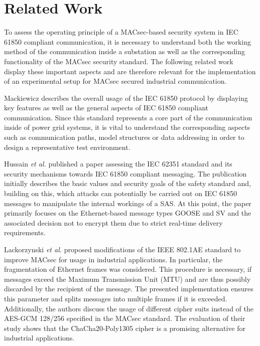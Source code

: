 \documentclass[conference, onecolumn, a4paper]{IEEEtran}
\begin{document}
\section{Related Work}
\label{chapter:relatedWork}
\noindent To assess the operating principle of a MACsec-based security system in IEC 61850 compliant communication, it is necessary to understand both 
the working method of the communication inside a substation as well as the corresponding functionality of the MACsec security standard. The following 
related work display these important aspects and are therefore relevant for the implementation of an experimental setup for MACsec secured industrial 
communication.

\smallskip
Mackiewicz \cite{IEC61850_Overview:2006} describes the overall usage of the IEC 61850 protocol by displaying key features as well as the general aspects 
of IEC 61850 compliant communication. Since this standard represents a core part of the communication inside of power grid systems, it is vital to 
understand the corresponding aspects such as communication paths, model structures or data addressing in order to design a representative test environment. 

\smallskip
Hussain  \textit{et al.} \cite{Review_IEC62351:2019} published a paper assessing the IEC 62351 standard and its security mechanisms towards IEC 61850 
compliant messaging. The publication initially describes the basic values and security goals of the safety standard and, building on this, which attacks 
can potentially be carried out on IEC 61850 messages to manipulate the internal workings of a SAS. At this point, the paper primarily focuses on the 
Ethernet-based message types GOOSE and SV and the associated decision not to encrypt them due to strict real-time delivery requirements.  

\smallskip
Lackorzynski \textit{et al.} \cite{MACsecIndustrialOptimization:2020} proposed modifications of the IEEE 802.1AE standard to improve MACsec for usage 
in industrial applications. In particular, the fragmentation of Ethernet frames was considered. This procedure is necessary, if messages exceed the 
Maximum Transmission Unit (MTU) and are thus possibly discarded by the recipient of the message. The presented implementation ensures this parameter 
and splits messages into multiple frames if it is exceeded. Additionally, the authors discuss the usage of different cipher suits instead of the 
AES-GCM 128/256 specified in the MACsec standard. The evaluation of their study shows that the ChaCha20-Poly1305 cipher is a promising alternative 
for industrial applications.
\end{document}
